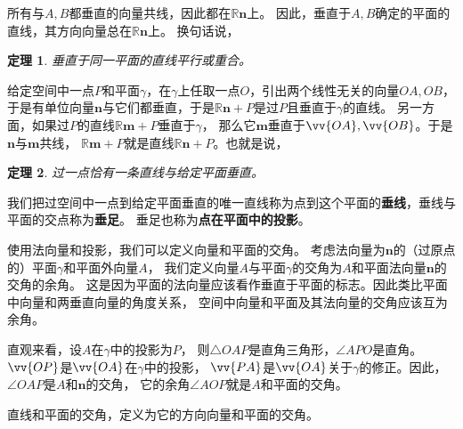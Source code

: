 \documentclass[12pt,UTF8]{ctexbook}
\newtheorem{tm}{定理}[section]
\begin{document}
所有与$A,B$都垂直的向量共线，因此都在$\mathbb{R}\mathbf{n}$上。
因此，垂直于$A,B$确定的平面的直线，其方向向量总在$\mathbb{R}\mathbf{n}$上。
换句话说，
\begin{tm}\label{tm:1-3-40}
    垂直于同一平面的直线平行或重合。
\end{tm}
给定空间中一点$P$和平面$\gamma$，在$\gamma$上任取一点$O$，引出两个线性无关的向量$OA,OB$，
于是有单位向量$\mathbf{n}$与它们都垂直，于是$\mathbb{R}\mathbf{n} + P$是过$P$且垂直于$\gamma$的直线。
另一方面，如果过$P$的直线$\mathbb{R}\mathbf{m} + P$垂直于$\gamma$，
那么它$\mathbf{m}$垂直于$\vv{OA},\vv{OB}$。于是$\mathbf{n}$与$\mathbf{m}$共线，
$\mathbb{R}\mathbf{m} + P$就是直线$\mathbb{R}\mathbf{n} + P$。也就是说，
\begin{tm}\label{tm:1-3-50}
    过一点恰有一条直线与给定平面垂直。
\end{tm}
我们把过空间中一点到给定平面垂直的唯一直线称为点到这个平面的\textbf{垂线}，垂线与平面的交点称为\textbf{垂足}。
垂足也称为\textbf{点在平面中的投影}。

使用法向量和投影，我们可以定义向量和平面的交角。
考虑法向量为$\mathbf{n}$的（过原点的）平面$\gamma$和平面外向量$A$，
我们定义向量$A$与平面$\gamma$的交角为$A$和平面法向量$\mathbf{n}$的交角的余角。
这是因为平面的法向量应该看作垂直于平面的标志。因此类比平面中向量和两垂直向量的角度关系，
空间中向量和平面及其法向量的交角应该互为余角。

直观来看，设$A$在$\gamma$中的投影为$P$，
则$\triangle OAP$是直角三角形，$\angle APO$是直角。$\vv{OP}$是$\vv{OA}$在$\gamma$中的投影，
$\vv{PA}$是$\vv{OA}$关于$\gamma$的修正。因此，$\angle OAP$是$A$和$\mathbf{n}$的交角，
它的余角$\angle AOP$就是$A$和平面的交角。

直线和平面的交角，定义为它的方向向量和平面的交角。
\end{document}
